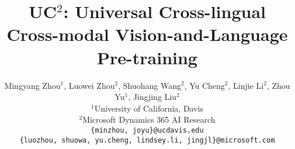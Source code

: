 \documentclass[final]{cvpr}
\newcommand{\ucabbrns}{\textsc{UC$^2$}}
\begin{document}
\title{\ucabbrns: Universal Cross-lingual Cross-modal Vision-and-Language Pre-training}
\author{Mingyang Zhou$^1$, Luowei Zhou$^2$, Shuohang Wang$^2$, Yu Cheng$^2$, Linjie Li$^2$, Zhou Yu$^1$, Jingjing Liu$^2$ \\
$^1$University of California, Davis \\
$^2$Microsoft Dynamics 365 AI Research \\
{\tt\small \{minzhou, joyu\}@ucdavis.edu} \\
{\tt\small \{luozhou, shuowa, yu.cheng, lindsey.li, jingjl\}@microsoft.com}
}

\maketitle
\end{document}

